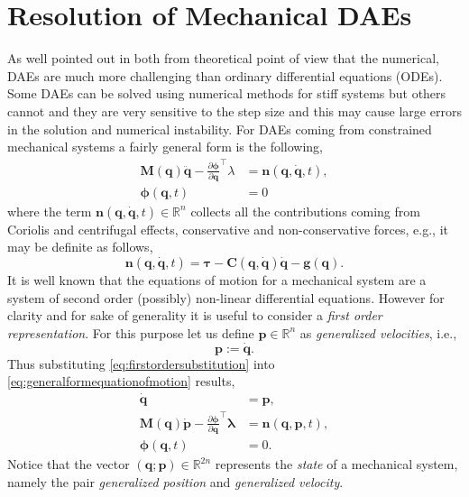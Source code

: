 	\section{Resolution of Mechanical DAEs}
		As well pointed out in \cite{petzold1982differential} both from theoretical point of view that the numerical, DAEs are much more challenging than ordinary differential equations (ODEs). Some DAEs can be solved using numerical methods for stiff systems but others cannot and they are very sensitive to the step size and this may cause large errors in the solution and numerical instability. For DAEs coming from constrained mechanical systems a fairly general form is the following, 
		\begin{subequations}
		\label{eq:generalformequationofmotion}
			\begin{align}
				\bm{M}(\bm{q})\ddot{\bm{q}} -\frac{\partial\bm{\phi}}{\partial\bm{q}}^{\intercal}\lambda &= \bm{n}(\bm{q},\dot{\bm{q}},t),\\
				\bm{\phi}(\bm{q},t) &= 0
			\end{align}
		\end{subequations}
		where the term $\bm{n}(\bm{q},\dot{\bm{q}},t)\in\mathbb{R}^{n}$ collects all the contributions coming from Coriolis and centrifugal effects, conservative and non-conservative forces, e.g., it may be definite as follows,
		\begin{equation*}
			\bm{n}(\bm{q},\dot{\bm{q}},t) = \bm{\tau}-\bm{C}(\bm{q},\dot{\bm{q}})\dot{\bm{q}}-\bm{g}(\bm{q}).
		\end{equation*}
		It is well known that the equations of motion for a mechanical system are a system of second order (possibly) non-linear differential equations. However for clarity and for sake of generality  it is useful to consider a \emph{first order representation}. For this purpose let us define $\bm{p}\in\mathbb{R}^{n}$ as \emph{generalized velocities}, i.e.,
		\begin{equation}
			\label{eq:firstordersubstitution}
			\bm{p} := \dot{\bm{q}}.
		\end{equation}
		Thus substituting \cref{eq:firstordersubstitution} into \cref{eq:generalformequationofmotion} results, 
		\begin{subequations}
		\label{eq:generalequationofmotionfirstorder}
			\begin{align}
				\dot{\bm{q}} &= \bm{p}, \\
				\bm{M}(\bm{q})\dot{\bm{p}} -\frac{\partial\bm{\phi}}{\partial\bm{q}}^{\intercal}\bm{\lambda} &= \bm{n}(\bm{q},\bm{p},t),\\
				\bm{\phi}(\bm{q},t) &= 0.
			\end{align}
		\end{subequations}
		Notice that the vector $(\bm{q};\bm{p})\in\mathbb{R}^{2n}$ represents the \emph{state} of a mechanical system, namely the pair \emph{generalized position} and \emph{generalized velocity}.
		
